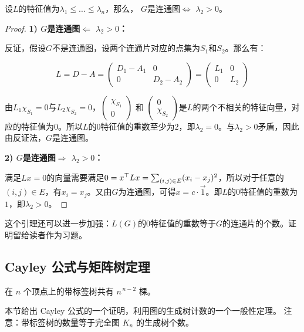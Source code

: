 \begin{lemma}
\label{lem:lambda_connectivity}
    设$L$的特征值为$\lambda_1\leq\dots\leq\lambda_n$，那么，
    $G$是连通图$\Leftrightarrow$ $\lambda_2>0$。
\end{lemma}
\begin{proof}
\textbf{1) $G$是连通图$\Leftarrow$ $\lambda_2>0$：}

反证，假设$G$不是连通图，设两个连通片对应的点集为$S_1$和$S_2$。那么有：

\[L=D-A=\left(\begin{array}{cc}
    D_1-A_1 & 0 \\
    0 & D_2-A_2
\end{array}\right)=\left(\begin{array}{cc}
    L_1 & 0 \\
    0 & L_2
\end{array}\right)\]

由$L_1\chi_{S_1}=0$与$L_2\chi_{S_2}=0$，$\left(\begin{array}{cc}
     \chi_{S_1}\\
     0 
\end{array}\right)$ 和 $\left(\begin{array}{cc}
     0\\
     \chi_{S_2}
\end{array}\right)$是$L$的两个不相关的特征向量，对应的特征值为$0$。所以$L$的$0$特征值的重数至少为$2$，即$\lambda_2=0$。与$\lambda_2>0$矛盾，因此由反证法，$G$是连通图。

\textbf{2) $G$是连通图$\Rightarrow$ $\lambda_2>0$：}

满足$Lx=0$的向量需要满足$0={x}^{\top}{L}{x}=\sum_{(i,j)\in E}(x_i-x_j)^2$，所以对于任意的$(i,j)\in E$，有$x_i=x_j$。又由$G$为连通图，可得$x=c\cdot\overrightarrow{1}$。即$L$的$0$特征值的重数为$1$，即$\lambda_2>0$。
\end{proof}
这个引理还可以进一步加强：$L(G)$的$0$特征值的重数等于$G$的连通片的个数。证明留给读者作为习题。

\subsection{Cayley 公式与矩阵树定理}

\begin{theorem}[Cayley 公式]\label{thm:cayley}
在 $n$ 个顶点上的带标签树共有 $n^{\,n-2}$ 棵。
\end{theorem}

本节给出 Cayley 公式的一个证明，利用图的生成树计数的一个一般性定理。
注意：带标签树的数量等于完全图 $K_n$ 的生成树个数。

